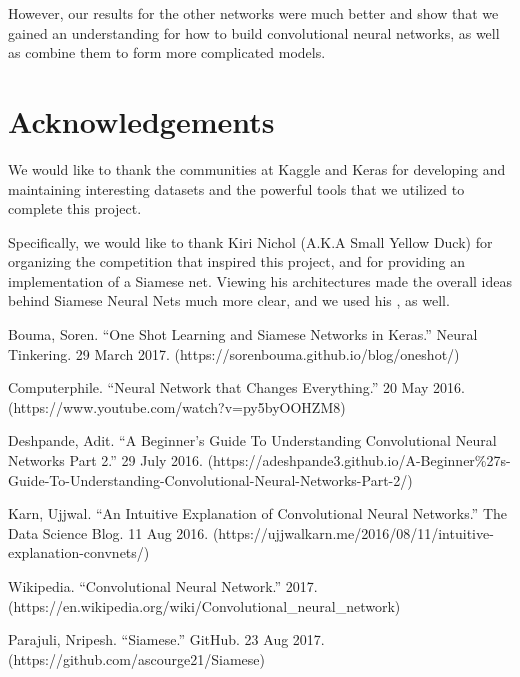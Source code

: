 \documentclass[a4paper, 11pt]{article}
\begin{document}
However, our results for the other networks were much better and show that we gained an understanding for how to build convolutional neural networks, as well as combine them to form more complicated models.

\section{Acknowledgements}

We would like to thank the communities at Kaggle and Keras for developing and maintaining interesting datasets and the powerful tools that we utilized to complete this project.

Specifically, we would like to thank Kiri Nichol (A.K.A Small Yellow Duck) for organizing the competition that inspired this project, and for providing an implementation of a Siamese net. Viewing his architectures made the overall ideas behind Siamese Neural Nets much more clear, and we used his , as well.


\newpage
\begin{thebibliography}{9}

   Bouma, Soren. ``One Shot Learning and Siamese Networks in Keras.'' Neural Tinkering. 29 March 2017. (https://sorenbouma.github.io/blog/oneshot/)
  
   Computerphile. ``Neural Network that Changes Everything.'' 20 May 2016. \newline (https://www.youtube.com/watch?v=py5byOOHZM8)

   Deshpande, Adit. ``A Beginner's Guide To Understanding Convolutional Neural Networks Part 2.'' 29 July 2016. (https://adeshpande3.github.io/A-Beginner\%27s-Guide-To-Understanding-Convolutional-Neural-Networks-Part-2/)

   Karn, Ujjwal. ``An Intuitive Explanation of Convolutional Neural Networks.'' The Data Science Blog. 11 Aug 2016. (https://ujjwalkarn.me/2016/08/11/intuitive-explanation-convnets/)

   Wikipedia. ``Convolutional Neural Network.'' 2017. \newline(https://en.wikipedia.org/wiki/Convolutional\_neural\_network)

   Parajuli, Nripesh. ``Siamese.'' GitHub. 23 Aug 2017. \newline(https://github.com/ascourge21/Siamese)
\end{thebibliography}
\end{document}
